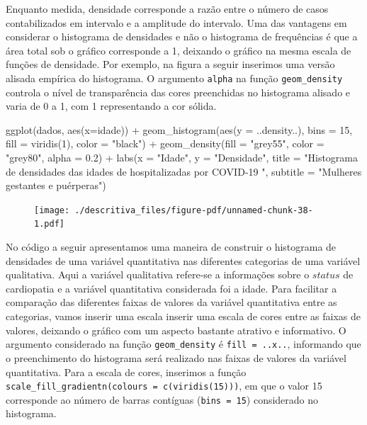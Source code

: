 \documentclass[
  letterpaper,
  DIV=11,
  numbers=noendperiod]{scrreprt}
\newenvironment{Shaded}{\begin{snugshade}}{\end{snugshade}}
\newcommand{\AttributeTok}[1]{\textcolor[rgb]{0.40,0.45,0.13}{#1}}
\newcommand{\DecValTok}[1]{\textcolor[rgb]{0.68,0.00,0.00}{#1}}
\newcommand{\FloatTok}[1]{\textcolor[rgb]{0.68,0.00,0.00}{#1}}
\newcommand{\FunctionTok}[1]{\textcolor[rgb]{0.28,0.35,0.67}{#1}}
\newcommand{\NormalTok}[1]{\textcolor[rgb]{0.00,0.23,0.31}{#1}}
\newcommand{\SpecialCharTok}[1]{\textcolor[rgb]{0.37,0.37,0.37}{#1}}
\newcommand{\StringTok}[1]{\textcolor[rgb]{0.13,0.47,0.30}{#1}}
\begin{document}
Enquanto medida, densidade corresponde a razão entre o número de casos
contabilizados em intervalo e a amplitude do intervalo. Uma das
vantagens em considerar o histograma de densidades e não o histograma de
frequências é que a área total sob o gráfico corresponde a 1, deixando o
gráfico na mesma escala de funções de densidade. Por exemplo, na figura
a seguir inserimos uma versão alisada empírica do histograma. O
argumento \texttt{alpha} na função \texttt{geom\_density} controla o
nível de transparência das cores preenchidas no histograma alisado e
varia de 0 a 1, com 1 representando a cor sólida.

\begin{Shaded}
\begin{Highlighting}[]
\FunctionTok{ggplot}\NormalTok{(dados, }\FunctionTok{aes}\NormalTok{(}\AttributeTok{x=}\NormalTok{idade))  }\SpecialCharTok{+} 
  \FunctionTok{geom\_histogram}\NormalTok{(}\FunctionTok{aes}\NormalTok{(}\AttributeTok{y =}\NormalTok{ ..density..), }\AttributeTok{bins =} \DecValTok{15}\NormalTok{, }\AttributeTok{fill =} \FunctionTok{viridis}\NormalTok{(}\DecValTok{1}\NormalTok{), }\AttributeTok{color =} \StringTok{"black"}\NormalTok{) }\SpecialCharTok{+}
  \FunctionTok{geom\_density}\NormalTok{(}\AttributeTok{fill =} \StringTok{"grey55"}\NormalTok{, }\AttributeTok{color =} \StringTok{"grey80"}\NormalTok{, }\AttributeTok{alpha =} \FloatTok{0.2}\NormalTok{) }\SpecialCharTok{+}
  \FunctionTok{labs}\NormalTok{(}\AttributeTok{x =} \StringTok{"Idade"}\NormalTok{, }\AttributeTok{y =} \StringTok{"Densidade"}\NormalTok{, }\AttributeTok{title =} \StringTok{"Histograma de densidades das idades de hospitalizadas por COVID{-}19 "}\NormalTok{, }\AttributeTok{subtitle =} \StringTok{"Mulheres gestantes e puérperas"}\NormalTok{)}
\end{Highlighting}
\end{Shaded}

\begin{figure}[H]

{\centering \texttt{[image: ./descritiva\_files/figure-pdf/unnamed-chunk-38-1.pdf]}

}

\end{figure}

No código a seguir apresentamos uma maneira de construir o histograma de
densidades de uma variável quantitativa nas diferentes categorias de uma
variável qualitativa. Aqui a variável qualitativa refere-se a
informações sobre o \(status\) de cardiopatia e a variável quantitativa
considerada foi a idade. Para facilitar a comparação das diferentes
faixas de valores da variável quantitativa entre as categorias, vamos
inserir uma escala inserir uma escala de cores entre as faixas de
valores, deixando o gráfico com um aspecto bastante atrativo e
informativo. O argumento considerado na função \texttt{geom\_density} é
\texttt{fill\ =\ ..x..}, informando que o preenchimento do histograma
será realizado nas faixas de valores da variável quantitativa. Para a
escala de cores, inserimos a função
\texttt{scale\_fill\_gradientn(colours\ =\ c(viridis(15)))}, em que o
valor 15 corresponde ao número de barras contíguas
(\texttt{bins\ =\ 15}) considerado no histograma.
\end{document}

